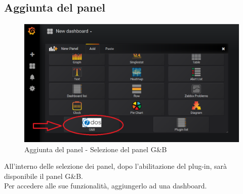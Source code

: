 \subsection{Aggiunta del panel}
\begin{figure} [H]
	\centering
	\includegraphics[scale=0.8]{Img/aggiuntapanel} 
	\caption{Aggiunta del panel - Selezione del panel G\&B} \label{} 
\end{figure} 
All'interno delle selezione dei panel, dopo l'abilitazione del plug-in, sarà disponibile il panel G\&B.\\
Per accedere alle sue funzionalità, aggiungerlo ad una dashboard.
\pagebreak